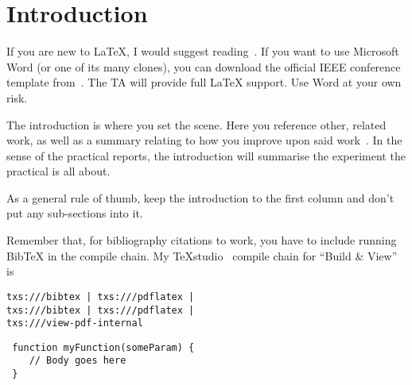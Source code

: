 \section{Introduction}
If you are new to \LaTeX{}, I would suggest reading~\cite{Oetiker_2015}.  If you want to use Microsoft Word (or one of its many clones), you can download the official IEEE conference template from~\cite{Word_Template}.  The TA will provide full \LaTeX{} support.  Use Word at your own risk.

The introduction is where you set the scene.  Here you reference other, related work, as well as a summary relating to how you improve upon said work~\cite{BibExample}.  In the sense of the practical reports, the introduction will summarise the experiment the practical is all about.

As a general rule of thumb, keep the introduction to the first column and don't put any \mbox{sub-sections} into it.

Remember that, for bibliography citations to work, you have to include running Bib\TeX{} in the compile chain.  My TeXstudio~\cite{TeXstudio} compile chain for ``Build \& View'' is\linebreak
\vspace{-6mm}
\begin{verbatim}
txs:///bibtex | txs:///pdflatex |
txs:///bibtex | txs:///pdflatex |
txs:///view-pdf-internal
\end{verbatim}

\begin{verbatim}
 function myFunction(someParam) {
	// Body goes here
 }
\end{verbatim}